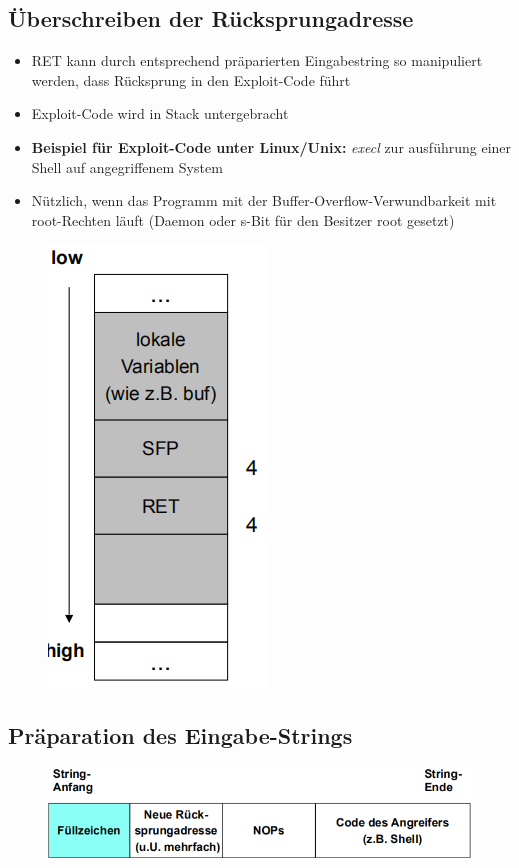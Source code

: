 \documentclass[openany]{book}
\begin{document}
\subsection{Überschreiben der Rücksprungadresse}

\begin{itemize}
    \item RET kann durch entsprechend präparierten Eingabestring so manipuliert werden, dass Rücksprung in den Exploit-Code führt
    \item Exploit-Code wird in Stack untergebracht
    \item \textbf{Beispiel für Exploit-Code unter Linux/Unix:} \textit{execl} zur ausführung einer Shell auf angegriffenem System
    \item Nützlich, wenn das Programm mit der Buffer-Overflow-Verwundbarkeit mit root-Rechten läuft (Daemon oder s-Bit für den Besitzer root gesetzt)
\end{itemize}

\newpage

\begin{figure}[h!]
    \centering
    \includegraphics[width=0.35\linewidth]{Pics/BufferOverflow2.PNG}
\end{figure}

\subsection{Präparation des Eingabe-Strings}

\begin{figure}[h!]
    \centering
    \includegraphics[width=0.85\linewidth]{Pics/BufferOverflow3.PNG}
\end{figure}
\end{document}

